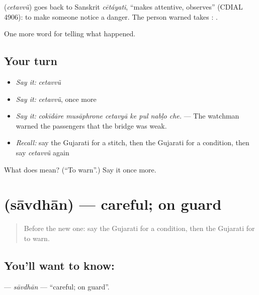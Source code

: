 \begin{cousinweb}
\textbf{} (\emph{cetavvũ}) goes back to Sanskrit \emph{cētáyati}, \textquotedblleft{}makes attentive, observes\textquotedblright{} (CDIAL 4906): to make someone notice a danger. The person warned takes \textbf{}: \textbf{ }.
\end{cousinweb}

\begin{grammarlens}[title={What you've built}]
One more word for telling what happened.
\end{grammarlens}

\subsection*{Your turn}
\begin{itemize}
\raggedright
  \item \emph{Say it:} \emph{cetavvũ}
  \item \emph{Say it:} \emph{cetavvũ}, once more
  \item \emph{Say it:} \emph{cokīdāre musāphrone cetavyā ke pul nabḷo che.} — The watchman warned the passengers that the bridge was weak.
  \item \emph{Recall:} say the Gujarati for a stitch, then the Gujarati for a condition, then say \emph{cetavvũ} again
\end{itemize}

\begin{tcolorbox}[breakable,colback=teal!4,colframe=teal!35!black,title={Before you move on}]
What does  mean? (\textquotedblleft{}To warn\textquotedblright{}.) Say it once more.
\end{tcolorbox}
\section[\texorpdfstring{\gu{સાવધાન} (sāvdhān)}{સાવધાન (sāvdhān)}]{ (sāvdhān) — careful; on guard}

\label{lesson:GU-C297-savdhan}



\begin{quote}
Before the new one: say the Gujarati for a condition, then the Gujarati for to warn.
\end{quote}

\subsection*{You'll want to know: }
\textbf{} — \emph{sāvdhān} — \textquotedblleft{}careful; on guard\textquotedblright{}.

